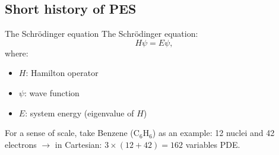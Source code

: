 \documentclass{beamer}
\begin{document}

\subsection{Short history of PES}
\begin{frame}{The Schrödinger equation}
    The Schrödinger equation:
    \begin{equation}
        H \psi = E \psi,
        \label{eq:schro}
    \end{equation}
    where:
    \begin{itemize}
        \item $H$: Hamilton operator
        \item $\psi$: wave function
        \item $E$: system energy (eigenvalue of $H$)
    \end{itemize}
    For a sense of scale, take Benzene (C$_6$H$_6$) as an example:
    12 nuclei and 42 electrons $\rightarrow$ in Cartesian: $3 \times (12 + 42) = 162$ variables PDE.
\end{frame}
\end{document}
